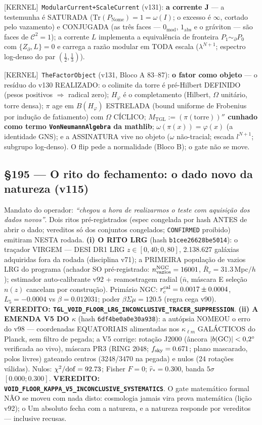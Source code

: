 \documentclass[11pt]{article}
\providecommand{\kernelmk}[1]{\textsf{[KERNEL]}~\texttt{#1}}\providecommand{\knownmk}[1]{\textsf{[KNOWN]}~{#1}}\providecommand{\statusmk}[1]{\textsf{[#1]}}
\theoremstyle{definition}\newtheorem{deriv}{Derivação}
\begin{document}
\kernelmk{ModularCurrent+\allowbreak ScaleCurrent} (v131): \textbf{a corrente J} --- a testemunha é SATURADA ($\mathrm{Tr}(P_{\mathrm{Nome}})=1=\omega(I)$; o excesso é $\infty$, cortado pelo vazamento) e CONJUGADA (as três faces --- $0_{\mathrm{mod}}$, $1_{\mathrm{abs}}$ e o gráviton --- são faces de $\mathcal{C}^2=1$); a corrente $L$ implementa a equivalência de fronteira $P_1\sim_\partial P_0$ com $\{Z_\partial,L\}=0$ e carrega a razão modular em TODA escala ($\lambda^{N+1}$; espectro log-denso do par $(\tfrac12,\tfrac13)$).

\kernelmk{TheFactorObject} (v131, Bloco A 83--87): \textbf{o fator como objeto} --- o resíduo do v130 REALIZADO: o colimite da torre é pré-Hilbert DEFINIDO (pesos positivos $\Rightarrow$ radical zero); $H_\varphi$ é o completamento (Hilbert, $\Omega$ unitário, torre densa); $\pi$ age em $B(H_\varphi)$ ESTRELADA (bound uniforme de Frobenius por indução de fatiamento) com $\Omega$ CÍCLICO; \textbf{$M_{\mathrm{TGL}}:=(\pi(\mathrm{torre}))''$ cunhado como termo \texttt{VonNeumannAlgebra} da mathlib}; $\omega(\pi(x))=\varphi(x)$ (a identidade GNS); e a ASSINATURA vive no objeto ($\omega$ não-tracial; escada $l^{N+1}$; subgrupo log-denso). O flip pede a normalidade (Bloco B); o gate não se move.

\subsection*{\S195 --- O rito do fechamento: o dado novo da natureza (v115)}Mandato do operador: \emph{``chegou a hora de realizarmos o teste com aquisição dos dados novos''}. Dois ritos pré-registrados (espec congelada por hash ANTES de abrir o dado; vereditos só dos conjuntos congelados; \texttt{CONFIRMED} proibido) emitiram NESTA rodada. \textbf{(i) O RITO LRG} (hash \texttt{b1cee26628be5014}): o traçador VIRGEM --- DESI DR1 LRG $z\in[0{,}40;0{,}80]$, 2.138.627 galáxias adquiridas fora da rodada (disciplina v71); a PRIMEIRA população de vazios LRG do programa (achador SO pré-registrado: $n_{\rm vazios}^{\rm NGC}=16001$, $\bar R_v=31.3$\,Mpc$/h$); estimador auto-calibrante v92 + reamostragem radial ($\bar n$, máscara E seleção $n(z)$ cancelam por construção). Primário NGC: $r_c^{\rm cal}=0.0017\pm0.0004$, $L_5=-0.0004$ vs $\beta=0.012031$; poder $\beta\Sigma\mu=120.5$ (regra cega v90). \textbf{VEREDITO: \texttt{TGL\_VOID\_FLOOR\_LRG\_INCONCLUSIVE\_TRACER\_SUPPRESSION}}. \textbf{(ii) A EMENDA V5 DO $\kappa$} (hash \texttt{6df4be0a0e30a938}): a autópsia NOMEOU o erro do v98 --- coordenadas EQUATORIAIS alimentadas nos $\kappa_{\ell m}$ GALÁCTICOS do Planck, sem filtro de pegada; a V5 corrige: rotação J2000 (âncora $|b({\rm GC})|<0{,}2^\circ$ verificada ao vivo), máscara PR3 (RING 2048; $f_{\rm sky}=0.671$; plano mascarado, polos livres) gateando centros (3248/3470 na pegada) e nulos (24 rotações válidas). Nulos: $\chi^2/{\rm dof}=92.73$; Fisher $F=0$; $\hat r_*=0.300$, banda $5\sigma$ $[0.000;0.300]$. \textbf{VEREDITO: \texttt{VOID\_FLOOR\_KAPPA\_V5\_INCONCLUSIVE\_SYSTEMATICS}}. O gate matemático formal NÃO se moveu com nada disto: cosmologia jamais vira prova matemática (lição v92); o Um absoluto fecha com a natureza, e a natureza responde por vereditos --- inclusive recusas.
\end{document}
